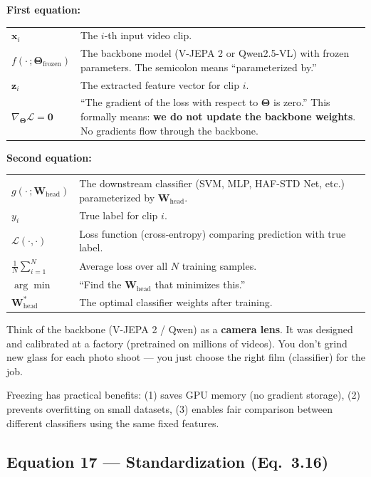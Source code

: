 \documentclass[12pt, a4paper]{article}
\begin{document}
\begin{explainbox}
\textbf{First equation:}
\begin{tabular}{lp{11cm}}
$\mathbf{x}_i$ & The $i$-th input video clip.\\[0.2cm]
$f(\cdot\,; \mathbf{\Theta}_{\text{frozen}})$ & The backbone model (V-JEPA 2 or Qwen2.5-VL) with frozen parameters. The semicolon means ``parameterized by.''\\[0.2cm]
$\mathbf{z}_i$ & The extracted feature vector for clip $i$.\\[0.2cm]
$\nabla_{\mathbf{\Theta}} \mathcal{L} = \mathbf{0}$ & ``The gradient of the loss with respect to $\mathbf{\Theta}$ is zero.'' This formally means: \textbf{we do not update the backbone weights}. No gradients flow through the backbone.
\end{tabular}

\textbf{Second equation:}
\begin{tabular}{lp{11cm}}
$g(\cdot\,; \mathbf{W}_{\text{head}})$ & The downstream classifier (SVM, MLP, HAF-STD Net, etc.) parameterized by $\mathbf{W}_{\text{head}}$.\\[0.2cm]
$y_i$ & True label for clip $i$.\\[0.2cm]
$\mathcal{L}(\cdot, \cdot)$ & Loss function (cross-entropy) comparing prediction with true label.\\[0.2cm]
$\frac{1}{N}\sum_{i=1}^{N}$ & Average loss over all $N$ training samples.\\[0.2cm]
$\arg\min$ & ``Find the $\mathbf{W}_{\text{head}}$ that minimizes this.''\\[0.2cm]
$\mathbf{W}_{\text{head}}^*$ & The optimal classifier weights after training.
\end{tabular}
\end{explainbox}

\begin{analogybox}
Think of the backbone (V-JEPA 2 / Qwen) as a \textbf{camera lens}. It was designed and calibrated at a factory (pretrained on millions of videos). You don't grind new glass for each photo shoot --- you just choose the right film (classifier) for the job.

Freezing has practical benefits: (1) saves GPU memory (no gradient storage), (2) prevents overfitting on small datasets, (3) enables fair comparison between different classifiers using the same fixed features.
\end{analogybox}


\subsection{Equation 17 --- Standardization (Eq.~3.16)}
\end{document}
